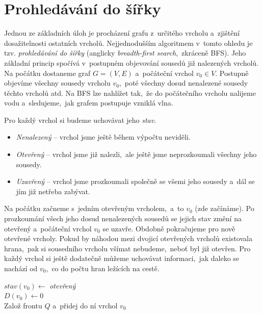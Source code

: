 \section{Prohledávání do šířky}\label{sec:bfs}

Jednou ze základních úloh je procházení grafu z~určitého vrcholu a~zjištění dosažitelnosti ostatních vrcholů. Nejjednodušším algoritmem v~tomto ohledu je tzv. \emph{prohledávání do šířky} (anglicky \emph{breadth-first search},~zkráceně BFS). Jeho základní princip spočívá v~postupném objevování sousedů již nalezených vrcholů. Na počátku dostaneme graf $G=(V,E)$ a~počáteční vrchol $v_0\in V$. Postupně objevíme všechny sousedy vrcholu $v_0$,~poté všechny dosud nenalezené sousedy těchto vrcholů atd. Na BFS lze nahlížet tak,~že do počátečního vrcholu nalijeme vodu a~sledujeme,~jak grafem postupuje vzniklá vlna.

Pro každý vrchol si budeme uchovávat jeho \emph{stav}.
\begin{itemize}
    \item \emph{Nenalezený} -- vrchol jsme ještě během výpočtu neviděli.
    \item \emph{Otevřený} -- vrchol jsme již nalezli,~ale ještě jsme neprozkoumali všechny jeho sousedy.
    \item \emph{Uzavřený} -- vrchol jsme prozkoumali společně se všemi jeho sousedy a~dál se jím již netřeba zabývat.
\end{itemize}
Na počátku začneme s~jedním otevřeným vrcholem,~a~to $v_0$ (zde začínáme). Po prozkoumání všech jeho dosud nenalezených sousedů se jejich stav změní na otevřený a~počáteční vrchol $v_0$ se uzavře. Obdobně pokračujeme pro nově otevřené vrcholy. Pokud by náhodou mezi dvojicí otevřených vrcholů existovala hrana,~pak si sousedního vrcholu všímat nebudeme,~neboť byl již otevřen. Pro každý vrchol si ještě dodatečně můžeme uchovávat informaci,~jak daleko se nachází od $v_0$,~co do počtu hran ležících na cestě.
\begin{algorithm}
    \caption{BFS (prohledávání do šířky)}
    \label{alg:bfs}
    $stav(v_0)\gets$ \textit{otevřený}\\
    $D(v_0)\gets 0$\\
    Založ frontu $Q$ a~přidej do ní vrchol $v_0$\\
\end{algorithm}

